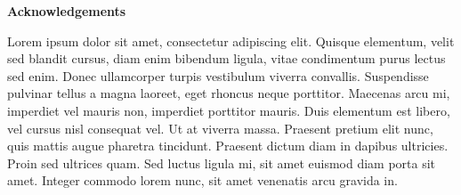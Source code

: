 \thispagestyle{empty}

\begin{center}
\vspace*{4cm}
\textbf{Acknowledgements}
\end{center}

\vspace*{0.3cm}
\begin{spacing}{1.0}
Lorem ipsum dolor sit amet, consectetur adipiscing elit. Quisque elementum, velit sed blandit cursus, diam enim bibendum ligula, vitae condimentum purus lectus sed enim. Donec ullamcorper turpis vestibulum viverra convallis. Suspendisse pulvinar tellus a magna laoreet, eget rhoncus neque porttitor. Maecenas arcu mi, imperdiet vel mauris non, imperdiet porttitor mauris. Duis elementum est libero, vel cursus nisl consequat vel. Ut at viverra massa. Praesent pretium elit nunc, quis mattis augue pharetra tincidunt. Praesent dictum diam in dapibus ultricies. Proin sed ultrices quam. Sed luctus ligula mi, sit amet euismod diam porta sit amet. Integer commodo lorem nunc, sit amet venenatis arcu gravida in.
\end{spacing}

\newpage
\blankpage